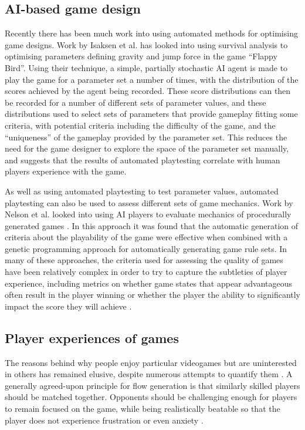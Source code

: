 \subsection{AI-based game design}

Recently there has been much work into using automated methods for optimising game designs. Work by Isaksen et al. \cite{isaksen2015exploring} \cite{isaksendiscovering} has looked into using survival analysis to optimising parameters defining gravity and jump force in the game ``Flappy Bird''. Using their technique, a simple, partially stochastic AI agent is made to play the game for a parameter set a number of times, with the distribution of the scores achieved by the agent being recorded. These score distributions can then be recorded for a number of different sets of parameter values, and these distributions used to select sets of parameters that provide gameplay fitting some criteria, with potential criteria including the difficulty of the game, and the ``uniqueness'' of the gameplay provided by the parameter set. This reduces the need for the game designer to explore the space of the parameter set manually, and suggests that the results of automated playtesting correlate with human players experience with the game.

As well as using automated playtesting to test parameter values, automated playtesting can also be used to assess different sets of game mechanics. Work by Nelson et al. looked into using AI players to evaluate mechanics of procedurally generated games \cite{nelson2015rules}. In this approach it was found that the automatic generation of criteria about the playability of the game were effective when combined with a genetic programming approach for automatically generating game rule sets. In many of these approaches, the criteria used for assessing the quality of games have been relatively complex in order to try to capture the subtleties of player experience, including metrics on whether game states that appear advantageous often result in the player winning \cite{nelson2015rules} or whether the player the ability to significantly impact the score they will achieve \cite{cook2011multi}.

\subsection{Player experiences of games}

The reasons behind why people enjoy particular videogames but are uninterested in others has remained elusive, despite numerous attempts to quantify them \cite{yannakakis2006modeling} \cite{procci2012measuring}. A generally agreed-upon principle for flow generation is that similarly skilled players should be matched together. Opponents should be challenging enough for players to remain focused on the game, while being realistically beatable so that the player does not experience frustration or even anxiety \cite{ibanez2011adaptive}.

